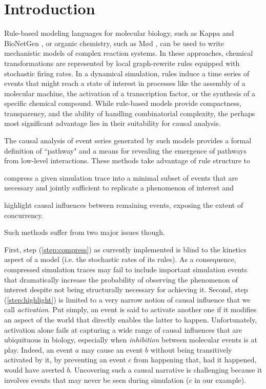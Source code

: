 
\section*{Introduction}\label{sec:intro}

Rule-based modeling languages for molecular biology, such as Kappa
\cite{DanosEtAl-CONCUR07} and BioNetGen \cite{bngl}, or organic
chemistry, such as M{\o}d \cite{moll}, can be used to write
mechanistic models of complex reaction systems. In these approaches,
chemical transformations are represented by local graph-rewrite rules
equipped with stochastic firing rates. In a dynamical simulation,
rules induce a time series of events that might reach a state of
interest in processes like the assembly of a molecular machine, the
activation of a transcription factor, or the synthesis of a specific
chemical compound. While rule-based models provide compactness,
transparency, and the ability of handling combinatorial complexity,
the perhaps most significant advantage lies in their suitability for
causal analysis.

% 

The causal analysis
\cite{DBLP:conf/fsttcs/DanosFFHH12,DanosEtAl-CONCUR07} of event series
generated by such models provides a formal definition of ``pathway"
and a means for revealing the emergence of pathways from low-level
interactions. These methods take advantage of rule structure to
\begin{inparaenum}[(i)]
\item \label{step:compress} compress a given simulation trace into a
  minimal subset of events that are necessary and jointly sufficient
  to replicate a phenomenon of interest and
\item \label{step:highlight} highlight causal influences between
  remaining events, exposing the extent of concurrency.
\end{inparaenum}
Such methods suffer from two major issues though.

First, step (\ref{step:compress}) as currently implemented is blind to
the kinetics aspect of a model (i.e. the stochastic rates of its
rules).  As a consequence, compressed simulation traces may fail to
include important simulation events that dramatically increase the
probability of observing the phenomenon of interest despite not being
structurally necessary for achieving it. Second, step
(\ref{step:highlight}) is limited to a very narrow notion of causal
influence that we call \emph{activation}. Put simply, an event is said
to activate another one if it modifies an aspect of the world that
directly enables the latter to happen. Unfortunately, activation alone
fails at capturing a wide range of causal influences that are
ubiquituous in biology, especially when \emph{inhibition} between
molecular events is at play.  Indeed, an event $a$ may cause an event
$b$ without being transitively activated by it, by preventing an event
$c$ from happening that, had it happened, would have averted
$b$. Uncovering such a causal narrative is challenging because it
involves events that may never be seen during simulation ($c$ in our
example).

